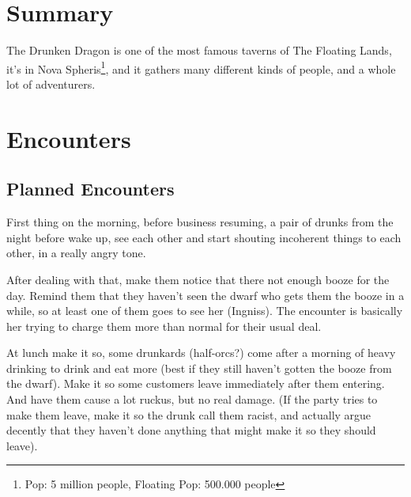 


\section{Summary}
The Drunken Dragon is one of the most famous taverns of The Floating Lands, it's in Nova Spheris\footnote{Pop: 5 million people, Floating Pop: 500.000 people}, and it gathers many different kinds of people, and a whole lot of adventurers.
\section{Encounters}
\subsection{Planned Encounters}
First thing on the morning, before business resuming, a pair of drunks from the night before wake up, see each other and start shouting incoherent things to each other, in a really angry tone.

After dealing with that, make them notice that there not enough booze for the day. Remind them that they haven't seen the dwarf who gets them the booze in a while, so at least one of them goes to see her (Ingniss). The encounter is basically her trying to charge them more than normal for their usual deal.

At lunch make it so, some drunkards (half-orcs?) come after a morning of heavy drinking to drink and eat more (best if they still haven't gotten the booze from the dwarf). Make it so some customers leave immediately after them entering. And have them cause a lot ruckus, but no real damage. (If the party tries to make them leave, make it so the drunk call them racist, and actually argue decently that they haven't done anything that might make it so they should leave).


